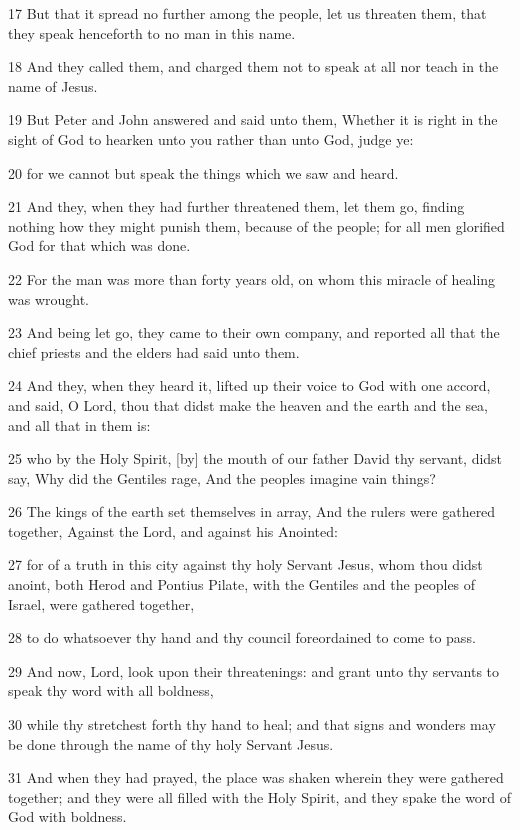 \par 17 But that it spread no further among the people, let us threaten them, that they speak henceforth to no man in this name.
\par 18 And they called them, and charged them not to speak at all nor teach in the name of Jesus.
\par 19 But Peter and John answered and said unto them, Whether it is right in the sight of God to hearken unto you rather than unto God, judge ye:
\par 20 for we cannot but speak the things which we saw and heard.
\par 21 And they, when they had further threatened them, let them go, finding nothing how they might punish them, because of the people; for all men glorified God for that which was done.
\par 22 For the man was more than forty years old, on whom this miracle of healing was wrought.
\par 23 And being let go, they came to their own company, and reported all that the chief priests and the elders had said unto them.
\par 24 And they, when they heard it, lifted up their voice to God with one accord, and said, O Lord, thou that didst make the heaven and the earth and the sea, and all that in them is:
\par 25 who by the Holy Spirit, [by] the mouth of our father David thy servant, didst say, Why did the Gentiles rage, And the peoples imagine vain things?
\par 26 The kings of the earth set themselves in array, And the rulers were gathered together, Against the Lord, and against his Anointed:
\par 27 for of a truth in this city against thy holy Servant Jesus, whom thou didst anoint, both Herod and Pontius Pilate, with the Gentiles and the peoples of Israel, were gathered together,
\par 28 to do whatsoever thy hand and thy council foreordained to come to pass.
\par 29 And now, Lord, look upon their threatenings: and grant unto thy servants to speak thy word with all boldness,
\par 30 while thy stretchest forth thy hand to heal; and that signs and wonders may be done through the name of thy holy Servant Jesus.
\par 31 And when they had prayed, the place was shaken wherein they were gathered together; and they were all filled with the Holy Spirit, and they spake the word of God with boldness.

